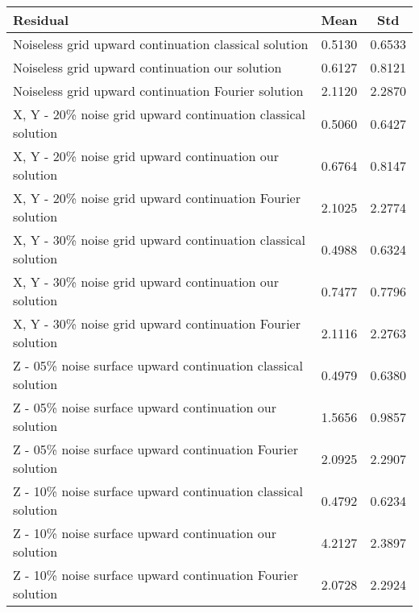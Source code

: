{
	\begin{center}
		\begin{tabular}[]{|l|c|c|}
			\hline
			Residual                                                      & Mean   & Std \\
			\hline
			Noiseless grid upward continuation classical solution         & 0.5130 & 0.6533 \\
			\hline
			Noiseless grid upward continuation our solution               & 0.6127 & 0.8121 \\
			\hline
			Noiseless grid upward continuation Fourier solution           & 2.1120 & 2.2870 \\
			\hline
			X, Y - 20\% noise grid upward continuation classical solution & 0.5060 & 0.6427 \\
			\hline
			X, Y - 20\% noise grid upward continuation our solution       & 0.6764 & 0.8147 \\
			\hline
			X, Y - 20\% noise grid upward continuation Fourier solution   & 2.1025 & 2.2774 \\
			\hline
			X, Y - 30\% noise grid upward continuation classical solution & 0.4988 & 0.6324 \\
			\hline
			X, Y - 30\% noise grid upward continuation our solution       & 0.7477 & 0.7796 \\
			\hline
			X, Y - 30\% noise grid upward continuation Fourier solution   & 2.1116 & 2.2763 \\
			\hline
			Z - 05\% noise surface upward continuation classical solution & 0.4979 & 0.6380 \\
			\hline
			Z - 05\% noise surface upward continuation our solution       & 1.5656 & 0.9857 \\
			\hline
			Z - 05\% noise surface upward continuation Fourier solution   & 2.0925 & 2.2907 \\
			\hline
			Z - 10\% noise surface upward continuation classical solution & 0.4792 & 0.6234 \\
			\hline
			Z - 10\% noise surface upward continuation our solution       & 4.2127 & 2.3897 \\
			\hline
			Z - 10\% noise surface upward continuation Fourier solution   & 2.0728 & 2.2924 \\
			\hline
		\end{tabular}
	\end{center} 
}

